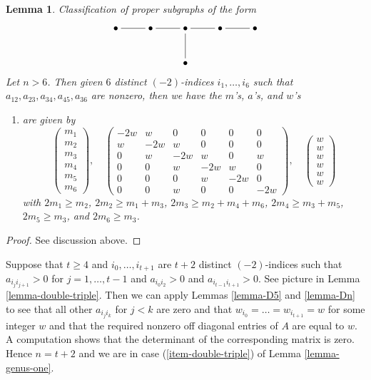 \documentclass{stacks-project}
\theoremstyle{plain}
\newtheorem{lemma}[subsection]{Lemma}
\theoremstyle{definition}
\theoremstyle{remark}
\numberwithin{equation}{subsection}
\begin{document}
\begin{lemma}
\label{lemma-E6}
Classification of proper subgraphs of the form
$$
\xymatrix{
\bullet \ar@{-}[r] & \bullet \ar@{-}[r] & \bullet \ar@{-}[r] \ar@{-}[d] &
\bullet \ar@{-}[r] & \bullet \\
& & \bullet
}
$$
Let $n > 6$. Then given $6$ distinct $(-2)$-indices $i_1, \ldots, i_6$
such that $a_{12}, a_{23}, a_{34}, a_{45}, a_{36}$ are nonzero, then
we have the $m$'s, $a$'s, and $w$'s
\begin{enumerate}
\item
\label{item-E6}
are given by
$$
\left(
\begin{matrix}
m_1 \\
m_2 \\
m_3 \\
m_4 \\
m_5 \\
m_6
\end{matrix}
\right),
\quad
\left(
\begin{matrix}
-2w & w & 0 & 0 & 0 & 0 \\
w & -2w & w & 0 & 0 & 0 \\
0 & w & -2w & w & 0 & w \\
0 & 0 & w & -2w & w & 0 \\
0 & 0 & 0 & w & -2w & 0 \\
0 & 0 & w & 0 & 0 & -2w
\end{matrix}
\right),
\quad
\left(
\begin{matrix}
w \\
w \\
w \\
w \\
w \\
w
\end{matrix}
\right)
$$
with $2m_1 \geq m_2$, $2m_2 \geq m_1 + m_3$, $2m_3 \geq m_2 + m_4 + m_6$,
$2m_4 \geq m_3 + m_5$, $2m_5 \geq m_3$, and $2m_6 \geq m_3$.
\end{enumerate}
\end{lemma}

\begin{proof}
See discussion above.
\end{proof}

\noindent
Suppose that $t \geq 4$ and $i_0, \ldots, i_{t + 1}$ are
$t + 2$ distinct $(-2)$-indices such that
$a_{i_ji_{j + 1}} > 0$ for $j = 1, \ldots, t - 1$
and $a_{i_0i_2} > 0$ and $a_{i_{t - 1}i_{t + 1}} > 0$.
See picture in Lemma \ref{lemma-double-triple}.
Then we can apply Lemmas \ref{lemma-D5} and \ref{lemma-Dn}
to see that all other $a_{i_ji_k}$ for $j < k$ are zero
and that $w_{i_0} = \ldots = w_{i_{t + 1}} = w$ for some
integer $w$ and that the required nonzero off diagonal
entries of $A$ are equal to $w$.
A computation shows that the determinant of the
corresponding matrix is zero. Hence $n = t + 2$
and we are in case (\ref{item-double-triple}) of
Lemma \ref{lemma-genus-one}.
\end{document}
